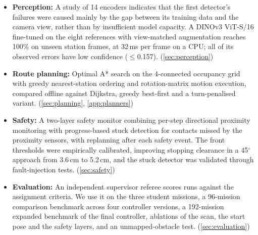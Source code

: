\begin{itemize}[nosep]
  \item \textbf{Perception:} A study of 14 encoders indicates that the first detector's failures were caused mainly by the gap between its training data and the camera view, rather than by insufficient model capacity. A DINOv3 ViT-S/16 fine-tuned on the eight references with view-matched augmentation reaches 100\% on unseen station frames, at 32\,ms per frame on a CPU; all of its observed errors have low confidence ($\le$0.157). (\cref{sec:perception})
  \item \textbf{Route planning:} Optimal A* search on the 4-connected occupancy grid with greedy nearest-station ordering and rotation-matrix motion execution, compared offline against Dijkstra, greedy best-first and a turn-penalised variant. (\cref{sec:planning}, \cref{app:planners})
  \item \textbf{Safety:} A two-layer safety monitor combining per-step directional proximity monitoring with progress-based stuck detection for contacts missed by the proximity sensors, with replanning after each safety event. 
  The front thresholds were empirically calibrated, improving stopping clearance in a 45$^\circ$ approach from 3.6\,cm to 5.2\,cm, and the stuck detector was validated through fault-injection tests. (\cref{sec:safety})
  \item \textbf{Evaluation:} An independent supervisor referee scores runs against the assignment criteria. We use it on the three student missions, a 96-mission comparison benchmark across four controller versions, a 192-mission expanded benchmark of the final controller, ablations of the scan, the start pose and the safety layers, and an unmapped-obstacle test. (\cref{sec:evaluation})
\end{itemize}
